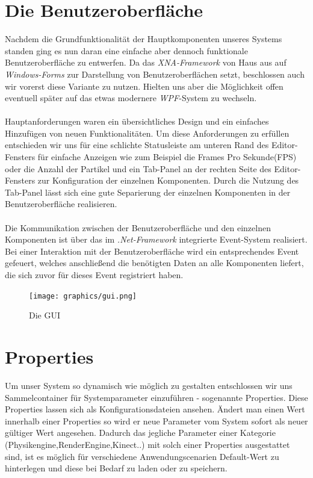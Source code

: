 \section{Die Benutzeroberfläche}
\begin{Spacing}{\mylinespace}

Nachdem die Grundfunktionalität der Hauptkomponenten unseres Systems standen ging es nun daran eine einfache aber dennoch funktionale Benutzeroberfläche zu entwerfen. Da das \textit{XNA-Framework} von Haus aus auf \textit{Windows-Forms} zur Darstellung von Benutzeroberflächen setzt, beschlossen auch wir vorerst diese Variante zu nutzen. Hielten uns aber die Möglichkeit offen eventuell später auf das etwas modernere \textit{WPF}-System zu wechseln.
\\\\
Hauptanforderungen waren ein übersichtliches Design und ein einfaches Hinzufügen von neuen Funktionalitäten. Um diese Anforderungen zu erfüllen entschieden wir uns für eine schlichte Statusleiste am unteren Rand des Editor-Fensters für einfache Anzeigen wie zum Beispiel die Frames Pro Sekunde(FPS) oder die Anzahl der Partikel und ein Tab-Panel an der rechten Seite des Editor-Fensters zur Konfiguration der einzelnen Komponenten. Durch die Nutzung des Tab-Panel lässt sich eine gute Separierung der einzelnen Komponenten in der Benutzeroberfläche realisieren. 
\\\\
Die Kommunikation zwischen der Benutzeroberfläche und den einzelnen Komponenten ist über das im \textit{.Net-Framework} integrierte Event-System realisiert. Bei einer Interaktion mit der Benutzeroberfläche wird ein entsprechendes Event gefeuert, welches anschließend die benötigten Daten an alle Komponenten liefert, die sich zuvor für dieses Event registriert haben.  

\begin{figure}[h!]
	\vspace*{30px}
	\texttt{[image: graphics/gui.png]}	
	\caption{Die GUI}
	\label{fig:GUI}
\end{figure}

\end{Spacing}
\newpage


\section{Properties}
Um unser System so dynamisch wie möglich zu gestalten entschlossen wir uns Sammelcontainer für Systemparameter einzuführen - sogenannte Properties.
Diese Properties lassen sich als Konfigurationsdateien ansehen. Ändert man einen Wert innerhalb einer Properties so wird er neue Parameter vom System sofort als neuer gültiger Wert angesehen.
Dadurch das jegliche Parameter einer Kategorie (Physikengine,RenderEngine,Kinect..) mit solch einer Properties ausgestattet sind, ist es möglich für verschiedene Anwendungscenarien Default-Wert zu hinterlegen und diese bei Bedarf zu laden oder zu speichern.

